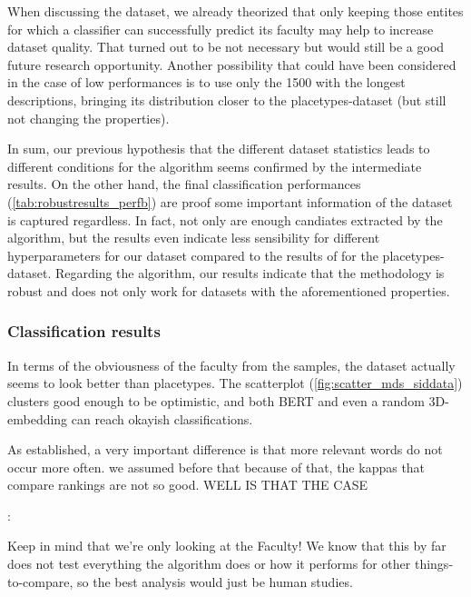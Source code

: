 When discussing the dataset, we already theorized that only keeping those entites for which a classifier can successfully predict its faculty may help to increase dataset quality. That turned out to be not necessary but would still be a good future research opportunity. Another possibility that could have been considered in the case of low performances is to use only the 1500 with the longest descriptions, bringing its distribution closer to the placetypes-dataset (but still not changing the properties). 

In sum, our previous hypothesis that the different dataset statistics leads to different conditions for the algorithm seems confirmed by the intermediate results. On the other hand, the final classification performances (\autoref{tab:robustresults_perfb}) are proof some important information of the dataset is captured regardless. In fact, not only are enough candiates extracted by the algorithm, but the results even indicate less sensibility for different hyperparameters for our dataset compared to the results of \cite{Derrac2015} for the placetypes-dataset. Regarding the algorithm, our results indicate that the methodology is robust and does not only work for datasets with the aforementioned properties.


\subsubsection{Classification results}

In terms of the obviousness of the faculty from the samples, the dataset actually seems to look better than placetypes. The scatterplot (\autoref{fig:scatter_mds_siddata}) clusters good enough to be optimistic, and both BERT and even a random 3D-embedding can reach okayish classifications.

As established, a very important difference is that more relevant words do not occur more often. we assumed before that because of that, the kappas that compare rankings are not so good. WELL IS THAT THE CASE


\cite{Ager2018}: 

Keep in mind that we're only looking at the Faculty! We know that this by far does not test everything the algorithm does or how it performs for other things-to-compare, so the best analysis would just be human studies.

